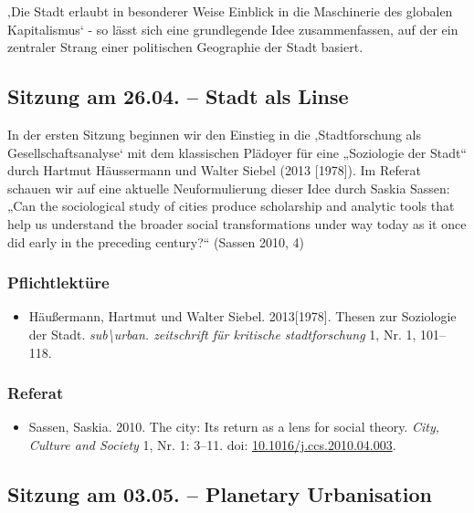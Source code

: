 \documentclass[
]{article}
\providecommand{\tightlist}{%
  \setlength{\itemsep}{0pt}\setlength{\parskip}{0pt}}
\begin{document}
‚Die Stadt erlaubt in besonderer Weise Einblick in die Maschinerie des globalen Kapitalismus` - so lässt sich eine grundlegende Idee zusammenfassen, auf der ein zentraler Strang einer politischen Geographie der Stadt basiert.

\hypertarget{sitzung-am-26.04.-stadt-als-linse}{%
\subsection{Sitzung am 26.04. -- Stadt als Linse}\label{sitzung-am-26.04.-stadt-als-linse}}

In der ersten Sitzung beginnen wir den Einstieg in die ‚Stadtforschung als Gesellschaftsanalyse` mit dem klassischen Plädoyer für eine „Soziologie der Stadt`` durch Hartmut Häussermann und Walter Siebel (2013 {[}1978{]}). Im Referat schauen wir auf eine aktuelle Neuformulierung dieser Idee durch Saskia Sassen: „Can the sociological study of cities produce scholarship and analytic tools that help us understand the broader social transformations under way today as it once did early in the preceding century?{}`` (Sassen 2010, 4)

\hypertarget{pflichtlektuxfcre}{%
\subsubsection*{Pflichtlektüre}\label{pflichtlektuxfcre}}

\begin{itemize}
\tightlist
\item
  Häußermann, Hartmut und Walter Siebel. 2013{[}1978{]}. Thesen zur Soziologie der Stadt. \emph{sub\textbackslash urban. zeitschrift für kritische stadtforschung} 1, Nr. 1, 101--118.
\end{itemize}

\hypertarget{referat}{%
\subsubsection*{Referat}\label{referat}}

\begin{itemize}
\tightlist
\item
  Sassen, Saskia. 2010. The city: Its return as a lens for social theory. \emph{City, Culture and Society} 1, Nr. 1: 3--11. doi: \href{https://doi.org/10.1016/j.ccs.2010.04.003}{10.1016/j.ccs.2010.04.003}.
\end{itemize}

\hypertarget{sitzung-am-03.05.-planetary-urbanisation}{%
\subsection{Sitzung am 03.05. -- Planetary Urbanisation}\label{sitzung-am-03.05.-planetary-urbanisation}}
\end{document}

